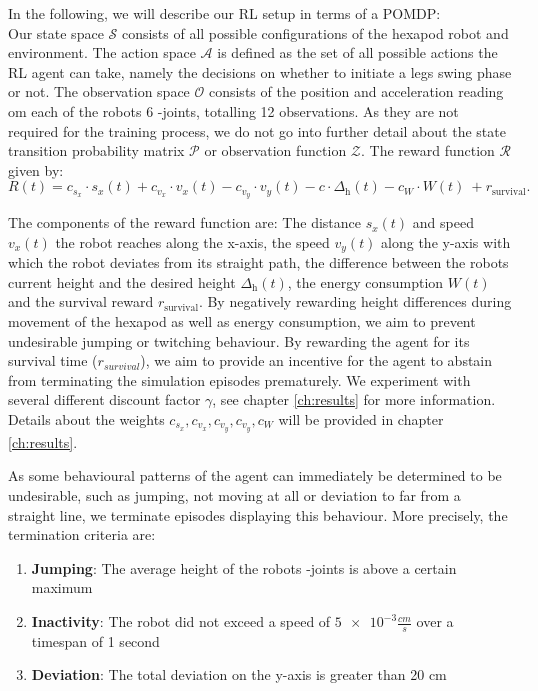 In the following, we will describe our RL setup in terms of a POMDP:\\
Our state space $\mathcal{S}$ consists of all possible configurations of the hexapod robot and environment.
The action space $\mathcal{A}$ is defined as the set of all possible actions the RL agent can take, namely the decisions on whether to initiate a legs swing phase or not.
The observation space $\mathcal{O}$ consists of the position and acceleration reading om each of the robots 6 \textalpha-joints, totalling 12 observations.
As they are not required for the training process, we do not go into further detail about the state transition probability matrix $\mathcal{P}$ or observation function $\mathcal{Z}$.
The reward function $\mathcal{R}$ given by:
 \[
 R(t) = c_{s_x} \cdot s_x(t) + c_{v_x} \cdot v_x(t) - c_{v_y} \cdot v_y(t) - c \cdot \Delta_\text{h}(t) - c_{W} \cdot W(t) \ + r_\text{survival}.
 \]
 
The components of the reward function are:
The distance $s_x(t)$ and speed $v_x(t)$ the robot reaches along the x-axis, the speed $v_y(t)$ along the y-axis with which the robot deviates from its straight path, the difference between the robots current height and the desired height $\Delta_\text{h}(t)$, the energy consumption $W(t)$ and the survival reward $r_\text{survival}$.
By negatively rewarding height differences during movement of the hexapod as well as energy consumption, we aim to prevent undesirable jumping or twitching behaviour.
By rewarding the agent for its survival time ($r_{survival}$), we aim to provide an incentive for the agent to abstain from terminating the simulation episodes prematurely.
We experiment with several different discount factor $\gamma$, see chapter \ref{ch:results} for more information.
Details about the weights $c_{s_x}, c_{v_x}, c_{v_y}, c_{v_y}, c_{W}$ will be provided in chapter \ref{ch:results}.

As some behavioural patterns of the agent can immediately be determined to be undesirable, such as jumping, not moving at all or deviation to far from a straight line, we terminate episodes displaying this behaviour.
More precisely, the termination criteria are:
\begin{enumerate}
	\item \textbf{Jumping}: The average height of the robots \textalpha-joints is above a certain maximum
	\item \textbf{Inactivity}: The robot did not exceed a speed of $\num{5e-3}\frac{cm}{s}$ over a timespan of 1 second
	\item \textbf{Deviation}: The total deviation on the y-axis is greater than 20 cm
\end{enumerate}

